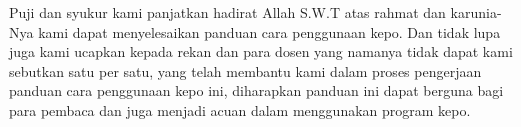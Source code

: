 \begin{acknowledgements}
Puji dan syukur kami panjatkan hadirat Allah S.W.T atas rahmat dan karunia-Nya kami dapat menyelesaikan panduan cara penggunaan kepo.
Dan tidak lupa juga kami ucapkan kepada rekan dan para dosen yang namanya tidak dapat kami sebutkan satu per satu, yang telah membantu kami dalam proses pengerjaan panduan cara penggunaan kepo ini, diharapkan panduan ini dapat berguna bagi para pembaca dan juga menjadi acuan dalam menggunakan program kepo.
\end{acknowledgements}